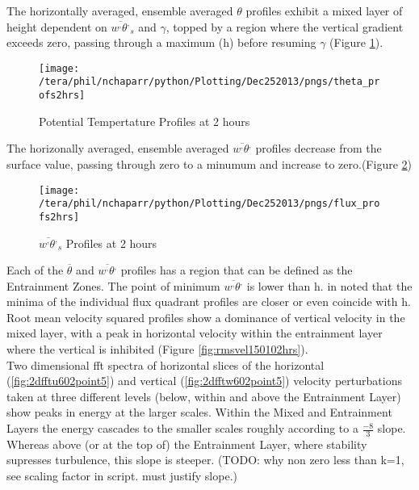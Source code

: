 The horizontally averaged, ensemble averaged $\theta$ profiles exhibit a mixed layer of height dependent on
$\overline{w^{,}\theta^{,}}_{s}$ and $\gamma$, topped by a region where the vertical gradient exceeds zero,
passing through a maximum (h) before resuming $\gamma$ (Figure \ref{fig:pottempprofs2hrs}).\\

\begin{figure}[!ht]
    \centering
    \texttt{[image: /tera/phil/nchaparr/python/Plotting/Dec252013/pngs/theta\_profs2hrs]}
    \caption{Potential Tempertature Profiles at 2 hours}
    \label{fig:pottempprofs2hrs}   %
\end{figure}


The horizonally averaged, ensemble averaged $\overline{w^{,}\theta^{,}}$ profiles decrease from the surface value, passing through zero to a minumum and increase to zero.(Figure \ref{fig:fluxprofs2hrs})\\

\begin{figure}[!ht]
    \centering
    \texttt{[image: /tera/phil/nchaparr/python/Plotting/Dec252013/pngs/flux\_profs2hrs]}
    \caption{$\overline{w^{,}\theta^{,}}_{s}$ Profiles at 2 hours}
    \label{fig:fluxprofs2hrs}   %
\end{figure}

Each of the $\overline{\theta}$ and $\overline{w^{,}\theta^{,}}$ profiles has a region that can be defined as the Entrainment Zones.  The point of minimum $\overline{w^{,}\theta^{,}}$
is lower than h.  \citeauthor{SullMoengStev} in \cite{SullMoengStev} noted that the minima of the individual flux quadrant profiles are closer or even coincide with h.\\

Root mean velocity squared profiles show a dominance of vertical velocity in the mixed layer, with a peak in horizontal velocity within the entrainment layer where the vertical is inhibited (Figure \ref{fig:rmsvel150102hrs}). \\

Two dimensional fft spectra of horizontal slices of the horizontal (\ref{fig:2dfftu602point5}) and vertical (\ref{fig:2dfftw602point5}) velocity perturbations taken at three
different levels (below, within and above the Entrainment Layer) show peaks in energy at the larger scales.  Within the Mixed
and Entrainment Layers the energy cascades to the smaller scales roughly according to a $\frac{-8}{3}$ slope.  Whereas
above (or at the top of) the Entrainment Layer, where stability supresses turbulence, this slope is steeper.  (TODO: why non zero less than k=1, see scaling factor in script.  must justify slope.)  


